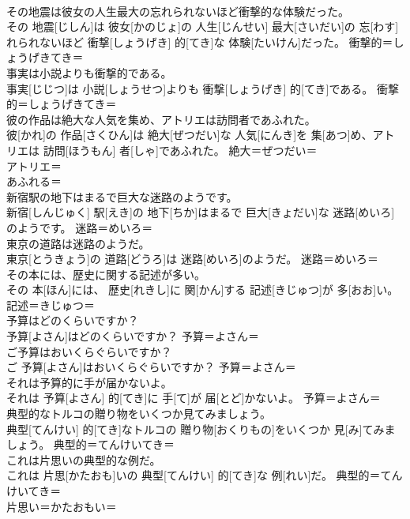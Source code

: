 \documentclass[8pt]{extreport}
\begin{document}
\begin{CJK}{UTF8}{min}
\\	その地震は彼女の人生最大の忘れられないほど衝撃的な体験だった。	
\\	その 地震[じしん]は 彼女[かのじょ]の 人生[じんせい] 最大[さいだい]の 忘[わす]れられないほど 衝撃[しょうげき] 的[てき]な 体験[たいけん]だった。	衝撃的＝しょうげきてき＝ 
\\	事実は小説よりも衝撃的である。	
\\	事実[じじつ]は 小説[しょうせつ]よりも 衝撃[しょうげき] 的[てき]である。	衝撃的＝しょうげきてき＝ 
\\	彼の作品は絶大な人気を集め、アトリエは訪問者であふれた。	
\\	彼[かれ]の 作品[さくひん]は 絶大[ぜつだい]な 人気[にんき]を 集[あつ]め、アトリエは 訪問[ほうもん] 者[しゃ]であふれた。	絶大＝ぜつだい＝ 
\\	アトリエ＝ 
\\	あふれる＝ 
\\	新宿駅の地下はまるで巨大な迷路のようです。	
\\	新宿[しんじゅく] 駅[えき]の 地下[ちか]はまるで 巨大[きょだい]な 迷路[めいろ]のようです。	迷路＝めいろ＝ 
\\	東京の道路は迷路のようだ。	
\\	東京[とうきょう]の 道路[どうろ]は 迷路[めいろ]のようだ。	迷路＝めいろ＝ 
\\	その本には、歴史に関する記述が多い。	
\\	その 本[ほん]には、 歴史[れきし]に 関[かん]する 記述[きじゅつ]が 多[おお]い。	記述＝きじゅつ＝ 
\\	予算はどのくらいですか？	
\\	予算[よさん]はどのくらいですか？	予算＝よさん＝ 
\\	ご予算はおいくらぐらいですか？	
\\	ご 予算[よさん]はおいくらぐらいですか？	予算＝よさん＝ 
\\	それは予算的に手が届かないよ。	
\\	それは 予算[よさん] 的[てき]に 手[て]が 届[とど]かないよ。	予算＝よさん＝ 
\\	典型的なトルコの贈り物をいくつか見てみましょう。	
\\	典型[てんけい] 的[てき]なトルコの 贈り物[おくりもの]をいくつか 見[み]てみましょう。	典型的＝てんけいてき＝ 
\\	これは片思いの典型的な例だ。	
\\	これは 片思[かたおも]いの 典型[てんけい] 的[てき]な 例[れい]だ。	典型的＝てんけいてき＝ 
\\	片思い＝かたおもい＝ 

\end{CJK}
\end{document}
